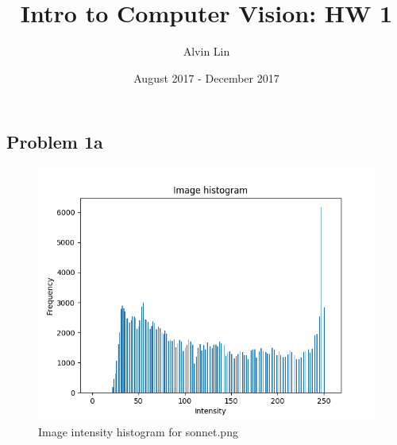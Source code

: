 \documentclass{math}
\title{Intro to Computer Vision: HW 1}
\author{Alvin Lin}
\date{August 2017 - December 2017}
\begin{document}
\maketitle
\captionsetup{justification=centering}

\subsection*{Problem 1a}
\begin{figure}[H]
  \centering
  \includegraphics[width=12cm]{assets/hw_01_sonnet_histogram.png}
  \caption{Image intensity histogram for sonnet.png}
\end{figure}
\end{document}
